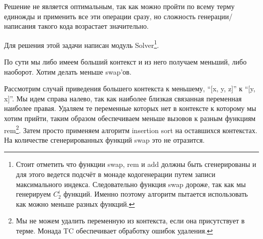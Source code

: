 Решение не является оптимальным, так как можно пройти по всему терму единожды и применить все эти операции сразу, но сложность генерации/написания такого кода возрастает значительно.

Для решения этой задачи написан модуль Solver\footnote{Стоит отметить что функции swap, rem и add должны быть сгенерированы и для этого ведется подсчёт в монаде кодогенерации путем записи максимального индекса. Следовательно функция swap дороже, так как мы генерируем $C_2^i$ функций. Именно поэтому алгоритм пытается использовать как можно меньше разных функций.}.

По сути мы либо имеем больший контекст и из него получаем меньший, либо наоборот. Хотим делать меньше swap'ов.

Рассмотрим случай приведения большего контекста к меньшему, ``[x, y, z]'' к ``[y, x]''. Мы идем справа налево, так как наиболее близкая связанная переменная наиболее правая. Удаляем те переменные которых нет в контексте к которому мы хотим прийти, таким образом обеспечиваем меньше вызовов к разным функциям rem\footnote{Мы не можем удалить переменную из контекста, если она присутствует в терме. Монада TC обеспечивает обработку ошибок удаления.}. Затем просто применяем алгоритм insertion sort на оставшихся контекстах. На количестве сгенерированных функций swap это не отразится.







